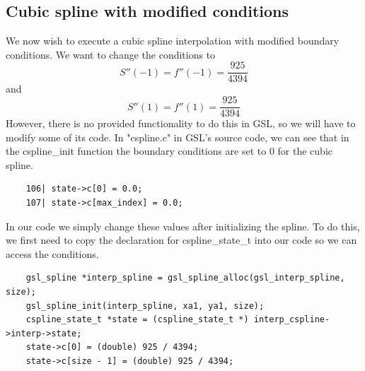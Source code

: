 \documentclass[11pt, a4paper, titlepage, openright]{article}
\begin{document}
\subsection{Cubic spline with modified conditions}
    We now wish to execute a cubic spline interpolation with modified boundary conditions.
    We want to change the conditions to \[ S''(-1) = f''(-1) = \frac{925}{4394} \] and \[ S''(1) = f''(1) = \frac{925}{4394} \]
    However, there is no provided functionality to do this in GSL, so we will have to modify some of its code.
    In "cspline.c" in GSL's source code, we can see that in the cspline\_init function the boundary conditions are set to 0 for the cubic spline.
    \begin{lstlisting}
    106| state->c[0] = 0.0;
    107| state->c[max_index] = 0.0;
    \end{lstlisting}
    In our code we simply change these values after initializing the spline. To do this, we first need to copy the declaration
    for cspline\_state\_t into our code so we can access the conditions.
    \begin{lstlisting}
    gsl_spline *interp_spline = gsl_spline_alloc(gsl_interp_spline, size);
    gsl_spline_init(interp_spline, xa1, ya1, size);
    cspline_state_t *state = (cspline_state_t *) interp_cspline->interp->state;
    state->c[0] = (double) 925 / 4394;
    state->c[size - 1] = (double) 925 / 4394;
    \end{lstlisting}
\end{document}
